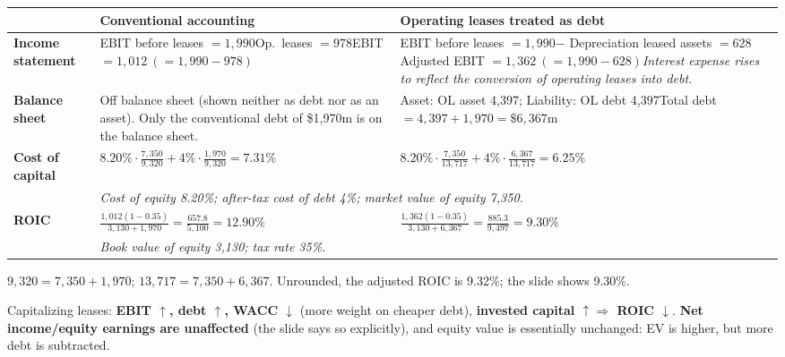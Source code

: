 \begin{exbox}
\small
\begin{tabularx}{\linewidth}{@{}>{\bfseries}p{2.1cm}XX@{}}
\toprule
& \textbf{\color{keyred}Conventional accounting} & \textbf{\color{keyred}Operating leases treated as debt}\\
\midrule
Income statement & EBIT before leases $=1{,}990$\newline Op.\ leases $=978$\newline EBIT $=1{,}012\ (=1{,}990-978)$ & EBIT before leases $=1{,}990$\newline $-$ Depreciation leased assets $=628$\newline Adjusted EBIT $=1{,}362\ (=1{,}990-628)$\newline \emph{Interest expense rises to reflect the conversion of operating leases into debt.}\\
\midrule
Balance sheet & Off balance sheet (shown neither as debt nor as an asset). Only the conventional debt of \$1,970m is on the balance sheet. & Asset: OL asset 4,397; Liability: OL debt 4,397\newline Total debt $=4{,}397+1{,}970=\$6{,}367$m\\
\midrule
Cost of capital & $8.20\%\cdot\frac{7{,}350}{9{,}320}+4\%\cdot\frac{1{,}970}{9{,}320}=\mathbf{7.31\%}$ & $8.20\%\cdot\frac{7{,}350}{13{,}717}+4\%\cdot\frac{6{,}367}{13{,}717}=\mathbf{6.25\%}$\\
& \multicolumn{2}{l}{\emph{Cost of equity 8.20\%; after-tax cost of debt 4\%; market value of equity 7,350.}}\\
\midrule
ROIC & $\frac{1{,}012(1-0.35)}{3{,}130+1{,}970}=\frac{657.8}{5{,}100}=\mathbf{12.90\%}$ & $\frac{1{,}362(1-0.35)}{3{,}130+6{,}367}=\frac{885.3}{9{,}497}=\mathbf{9.30\%}$\\
& \multicolumn{2}{l}{\emph{Book value of equity 3,130; tax rate 35\%.}}\\
\bottomrule
\end{tabularx}
\smallskip

\footnotesize $9{,}320=7{,}350+1{,}970$; $13{,}717=7{,}350+6{,}367$. Unrounded, the adjusted ROIC is 9.32\%; the slide shows 9.30\%.
\end{exbox}

\begin{addbox}
Capitalizing leases: \textbf{EBIT $\uparrow$, debt $\uparrow$, WACC $\downarrow$} (more weight on cheaper debt), \textbf{invested capital $\uparrow\Rightarrow$ ROIC $\downarrow$}. \textbf{Net income/equity earnings are unaffected} (the slide says so explicitly), and equity value is essentially unchanged: EV is higher, but more debt is subtracted.
\end{addbox}

